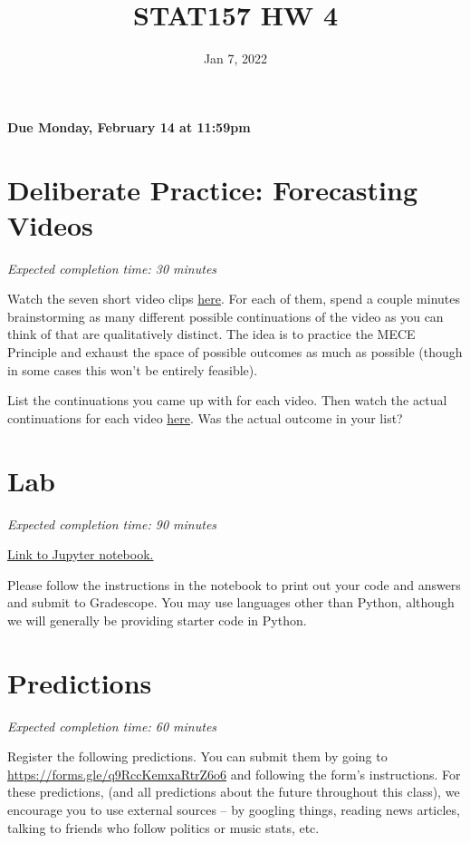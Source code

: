 \documentclass[11pt]{article}
\title{STAT157 HW 4}
\date{Jan 7, 2022}
\begin{document}
\maketitle

\hfill \textbf{Due Monday, February 14 at 11:59pm}

\section*{Deliberate Practice: Forecasting Videos}

\emph{Expected completion time: 30 minutes}

Watch the seven short video clips \href{http://www.stat157.com/assets/initial_clips.zip}{here}. For each of them, spend a couple minutes brainstorming as many different possible continuations of the video as you can think of that are qualitatively distinct. The idea is to practice the MECE Principle and exhaust the space of possible outcomes as much as possible (though in some cases this won't be entirely feasible).

List the continuations you came up with for each video. Then watch the actual continuations for each video \href{http://www.stat157.com/assets/full_videos.zip}{here}. Was the actual outcome in your list?

\section*{Lab}

\emph{Expected completion time: 90 minutes}

\href{https://datahub.berkeley.edu/hub/user-redirect/git-pull?repo=https%3A%2F%2Fgithub.com%2[…]stat-157-260-website%2Fhw%2Fhw4%2Fhw4lab.ipynb&branch=main}{Link to Jupyter notebook.} 

Please follow the instructions in the notebook to print out your code and answers and submit to Gradescope. You may use languages other than Python, although we will generally be providing starter code in Python.

\section*{Predictions}

\emph{Expected completion time: 60 minutes}

Register the following predictions. You can submit them by going to \url{https://forms.gle/q9RccKemxaRtrZ6o6} and following the form's instructions. For these predictions, (and all predictions about the future throughout this class), we encourage you to use external sources -- by googling things, reading news articles, talking to friends who follow politics or music stats, etc.
\end{document}
